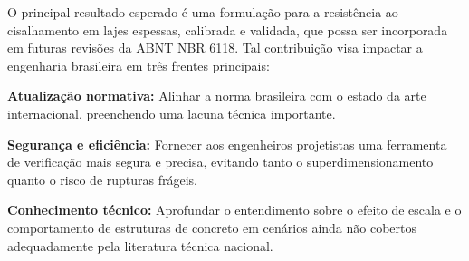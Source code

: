 \documentclass[
	12pt,				%
	openright,			%
	twoside,			%
	a4paper,			%
	chapter=TITLE,		%
	section=TITLE,		%
	subsection=TITLE,	%
	subsubsection=TITLE,%
	partnum=false,
	brazil,			%
]{abntex2}
\begin{document}
O principal resultado esperado é uma formulação para a resistência ao cisalhamento em lajes espessas, calibrada e validada, que possa ser incorporada em futuras revisões da ABNT NBR 6118. Tal contribuição visa impactar a engenharia brasileira em três frentes principais:
\begin{alineas}
    \item \textbf{Atualização normativa:} Alinhar a norma brasileira com o estado da arte internacional, preenchendo uma lacuna técnica importante.
    \item \textbf{Segurança e eficiência:} Fornecer aos engenheiros projetistas uma ferramenta de verificação mais segura e precisa, evitando tanto o superdimensionamento quanto o risco de rupturas frágeis.
    \item \textbf{Conhecimento técnico:} Aprofundar o entendimento sobre o efeito de escala e o comportamento de estruturas de concreto em cenários ainda não cobertos adequadamente pela literatura técnica nacional.
\end{alineas}

\postextual



\end{document}
